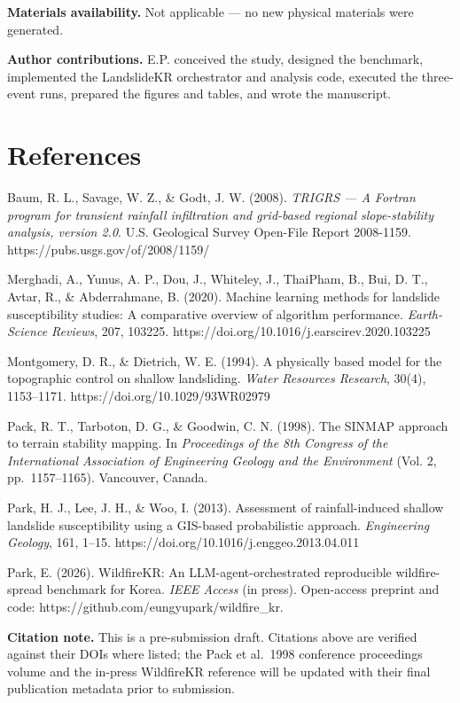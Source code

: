 \documentclass[11pt,a4paper]{article}
\begin{document}
\textbf{Materials availability.} Not applicable --- no new physical materials were generated.

\textbf{Author contributions.} E.P. conceived the study, designed the benchmark, implemented the LandslideKR orchestrator and analysis code, executed the three-event runs, prepared the figures and tables, and wrote the manuscript.

\section{References}\label{references}

Baum, R. L., Savage, W. Z., \& Godt, J. W. (2008). \emph{TRIGRS --- A Fortran program for transient rainfall infiltration and grid-based regional slope-stability analysis, version 2.0}. U.S. Geological Survey Open-File Report 2008-1159. https://pubs.usgs.gov/of/2008/1159/

Merghadi, A., Yunus, A. P., Dou, J., Whiteley, J., ThaiPham, B., Bui, D. T., Avtar, R., \& Abderrahmane, B. (2020). Machine learning methods for landslide susceptibility studies: A comparative overview of algorithm performance. \emph{Earth-Science Reviews}, 207, 103225. https://doi.org/10.1016/j.earscirev.2020.103225

Montgomery, D. R., \& Dietrich, W. E. (1994). A physically based model for the topographic control on shallow landsliding. \emph{Water Resources Research}, 30(4), 1153--1171. https://doi.org/10.1029/93WR02979

Pack, R. T., Tarboton, D. G., \& Goodwin, C. N. (1998). The SINMAP approach to terrain stability mapping. In \emph{Proceedings of the 8th Congress of the International Association of Engineering Geology and the Environment} (Vol. 2, pp.~1157--1165). Vancouver, Canada.

Park, H. J., Lee, J. H., \& Woo, I. (2013). Assessment of rainfall-induced shallow landslide susceptibility using a GIS-based probabilistic approach. \emph{Engineering Geology}, 161, 1--15. https://doi.org/10.1016/j.enggeo.2013.04.011

Park, E. (2026). WildfireKR: An LLM-agent-orchestrated reproducible wildfire-spread benchmark for Korea. \emph{IEEE Access} (in press). Open-access preprint and code: https://github.com/eungyupark/wildfire\_kr.

\textbf{Citation note.} This is a pre-submission draft. Citations above are verified against their DOIs where listed; the Pack et al.~1998 conference proceedings volume and the in-press WildfireKR reference will be updated with their final publication metadata prior to submission.
\end{document}
